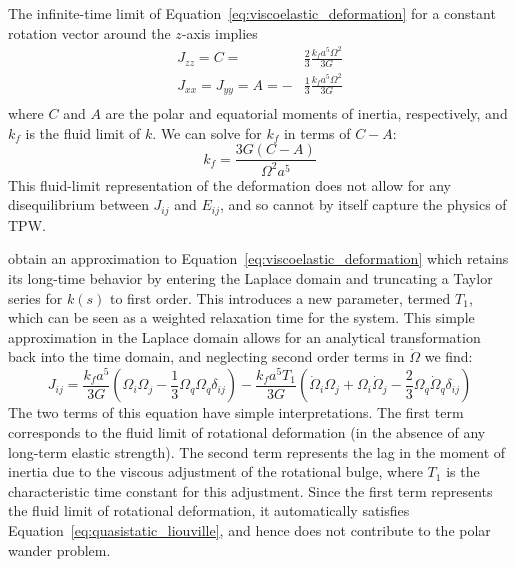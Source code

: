 \documentclass[extra,mreferee]{gji}
\begin{document}
The infinite-time limit of Equation~\eqref{eq:viscoelastic_deformation} for a 
constant rotation vector around the $z$-axis implies
\begin{equation}
\begin{aligned}
J_{zz} = C = &\frac{2}{3} \frac{k_f a^5 \Omega^2}{3 G} \\
J_{xx} = J_{yy} = A = -&\frac{1}{3} \frac{k_f a^5 \Omega^2}{3 G} \\
\end{aligned}
\end{equation}
where $C$ and $A$ are the polar and equatorial moments of inertia, respectively, 
and $k_f$ is the fluid limit of $k$. 
We can solve for $k_f$ in terms of $C-A$:
\begin{equation}
k_f = \frac{3 G (C-A)}{\Omega^2 a^5}
\label{eq:fluid_love}
\end{equation}
This fluid-limit representation of the deformation does not allow for any disequilibrium between $J_{ij}$ and $E_{ij}$,
and so cannot by itself capture the physics of TPW.

\citet{ricard1993polar} obtain an approximation to Equation~\eqref{eq:viscoelastic_deformation} which retains its long-time behavior by entering the Laplace domain and truncating a Taylor series for $k(s)$ to first order.  
This introduces a new parameter, termed $T_1$, which can be seen as a weighted relaxation time for the system.  
This simple approximation in the Laplace domain allows for an analytical transformation back into the time domain, and neglecting second order terms in $\dot{\Omega}$ we find:
\begin{equation}
J_{ij} = \frac{k_f a^5}{3 G} \left( \Omega_i \Omega_j - \frac{1}{3} \Omega_q \Omega_q \delta_{ij} \right) -
 \frac{k_f a^5 T_1}{3G} \left(\dot{\Omega}_i \Omega_j + \Omega_i \dot{\Omega}_j - \frac{2}{3} \Omega_q \dot{\Omega}_q \delta_{ij} \right)
\label{eq:rotational_deformation}
\end{equation}
The two terms of this equation have simple interpretations.  
The first term corresponds to the fluid limit of rotational deformation (in the absence of any long-term elastic strength).  
The second term represents the lag in the moment of inertia due to the viscous adjustment of the rotational bulge, where $T_1$ is the characteristic time constant for this adjustment.
Since the first term represents the fluid limit of rotational deformation, it automatically satisfies Equation~\eqref{eq:quasistatic_liouville}, and hence does not contribute to the polar wander problem.
\end{document}

